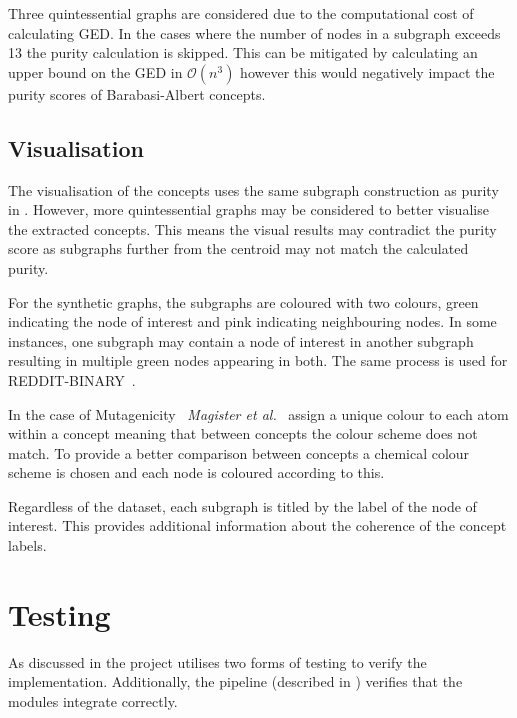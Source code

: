 Three quintessential graphs are considered due to the computational cost of calculating GED.
In the cases where the number of nodes in a subgraph exceeds 13 the purity calculation is skipped.
This can be mitigated by calculating an upper bound on the GED in $\mathcal{O}(n^3)$ however this would negatively impact the purity scores of Barabasi-Albert concepts.

\subsection{Visualisation}
\label{sec:vis}
The visualisation of the concepts uses the same subgraph construction as purity in .
However, more quintessential graphs may be considered to better visualise the extracted concepts.
This means the visual results may contradict the purity score as subgraphs further from the centroid may not match the calculated purity.

For the synthetic graphs, the subgraphs are coloured with two colours, green indicating the node of interest and pink indicating neighbouring nodes.
In some instances, one subgraph may contain a node of interest in another subgraph resulting in multiple green nodes appearing in both.
The same process is used for REDDIT-BINARY~\cite{Morris+2020}.

In the case of Mutagenicity~\cite{Morris+2020} \textit{Magister et al.}~\cite{magister2021gcexplainer} assign a unique colour to each atom within a concept meaning that between concepts the colour scheme does not match.
To provide a better comparison between concepts a chemical colour scheme is chosen and each node is coloured according to this.

Regardless of the dataset, each subgraph is titled by the label of the node of interest.
This provides additional information about the coherence of the concept labels.

\section{Testing}
\label{sec:testing-imp}
As discussed in  the project utilises two forms of testing to verify the implementation.
Additionally, the pipeline (described in ) verifies that the modules integrate correctly.

